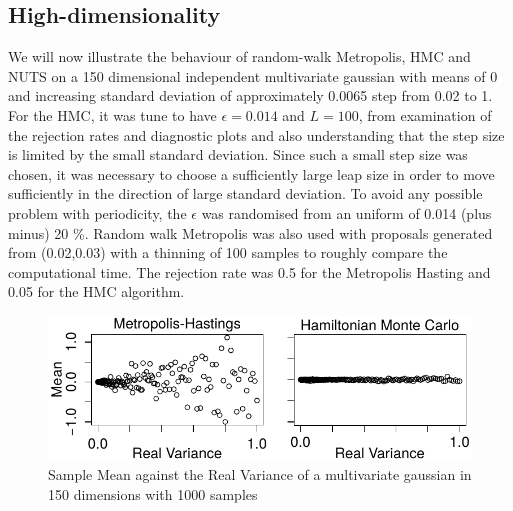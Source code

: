 \documentclass[11pt]{article}
\begin{document}
\subsection{High-dimensionality}
We will now illustrate the behaviour of random-walk Metropolis, HMC and NUTS on a 150 dimensional independent multivariate gaussian with means of 0 and increasing standard deviation of approximately 0.0065 step from 0.02 to 1. For the HMC, it was tune to have $\epsilon = 0.014$ and $L=100$, from examination of the rejection rates and diagnostic plots and also understanding that the step size is limited by the small standard deviation. Since such a small step size was chosen, it was necessary to choose a sufficiently large leap size in order to move sufficiently in the direction of large standard deviation. To avoid any possible problem with periodicity, the $\epsilon$ was randomised from an uniform of 0.014 (plus minus) 20 \%. Random walk Metropolis was also used with proposals generated from (0.02,0.03) with a thinning of 100 samples to roughly compare the computational time. The rejection rate was 0.5 for the Metropolis Hasting and 0.05 for the HMC algorithm. 
\begin{figure}[H]
\center
  \includegraphics[width=5in]{images/MHvsHM_var.pdf}
  \caption{Sample Mean against the Real Variance of a multivariate gaussian in 150 dimensions with 1000 samples}
\end{figure}
\end{document}

